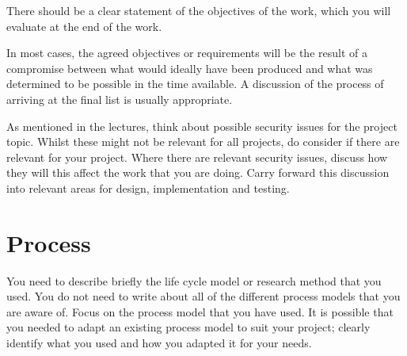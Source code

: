 There should be a clear statement of the objectives of the work, which you will evaluate at the end of the work. 

In most cases, the agreed objectives or requirements will be the result of a compromise between what would ideally have been produced and what was determined to be possible in the time available. A discussion of the process of arriving at the final list is usually appropriate.

As mentioned in the lectures, think about possible security issues for the project topic. Whilst these might not be relevant for all projects, do consider if there are relevant for your project. Where there are relevant security issues, discuss how they will this affect the work that you are doing. Carry forward this discussion into relevant areas for design, implementation and testing.

\section{Process}
You need to describe briefly the life cycle model or research method that you used. You do not need to write about all of the different process models that you are aware of. Focus on the process model that you have used. It is possible that you needed to adapt an existing process model to suit your project; clearly identify what you used and how you adapted it for your needs.
